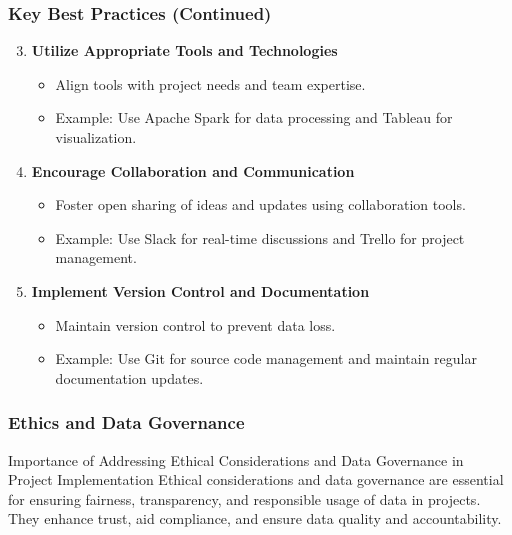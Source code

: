 \documentclass{beamer}
\begin{document}
\begin{frame}[fragile]
    \frametitle{Key Best Practices (Continued)}
    \begin{enumerate}
        \setcounter{enumi}{2} %
        \item \textbf{Utilize Appropriate Tools and Technologies}
            \begin{itemize}
                \item Align tools with project needs and team expertise.
                \item Example: Use Apache Spark for data processing and Tableau for visualization.
            \end{itemize}
            
        \item \textbf{Encourage Collaboration and Communication}
            \begin{itemize}
                \item Foster open sharing of ideas and updates using collaboration tools.
                \item Example: Use Slack for real-time discussions and Trello for project management.
            \end{itemize}

        \item \textbf{Implement Version Control and Documentation}
            \begin{itemize}
                \item Maintain version control to prevent data loss.
                \item Example: Use Git for source code management and maintain regular documentation updates.
            \end{itemize}
    \end{enumerate}
\end{frame}

\begin{frame}[fragile]
    \frametitle{Ethics and Data Governance}
    \begin{block}{Importance of Addressing Ethical Considerations and Data Governance in Project Implementation}
        Ethical considerations and data governance are essential for ensuring fairness, transparency, and responsible usage of data in projects. They enhance trust, aid compliance, and ensure data quality and accountability.
    \end{block}
\end{frame}
\end{document}
